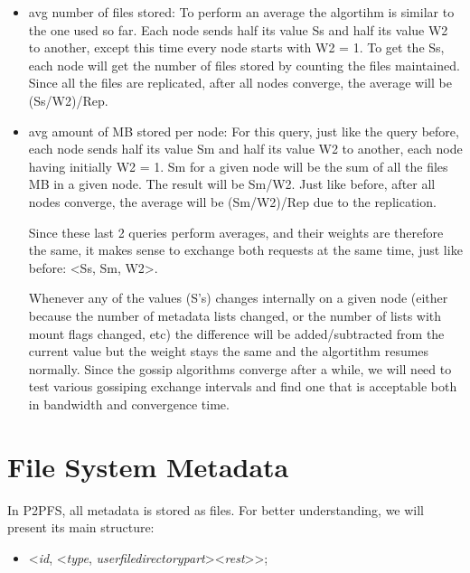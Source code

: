 \documentclass[times,9pt,article]{llncs}
\begin{document}
\begin{itemize}
\item avg number of files stored:
To perform an average the algortihm is similar to the one used so far. Each node
sends half its value Ss and half its value W2 to another, except this time every 
node starts with W2 = 1. To get the Ss, each node will get the number of files 
stored by counting the files maintained. Since all the files are replicated, after
all nodes converge, the average will be (Ss/W2)/Rep.

\item avg amount of MB stored per node:
For this query, just like the query before, each node sends half its value Sm and 
half its value W2 to another, each node having initially W2 = 1. Sm for a given node
will be the sum of all the files MB in a given node. The result will be Sm/W2. Just
like before, after all nodes converge, the average will be (Sm/W2)/Rep due to the 
replication.

Since these last 2 queries perform averages, and their weights are therefore the same,
it makes sense to exchange both requests at the same time, just like before:
\textless Ss, Sm, W2\textgreater.

Whenever any of the values (S's) changes internally on a given node (either because
the number of metadata lists changed, or the number of lists with mount flags changed,
etc) the difference will be added/subtracted from the current value but the weight 
stays the same and the algortithm resumes normally.
Since the gossip algorithms converge after a while, we will need to test various
gossiping exchange intervals and find one that is acceptable both in bandwidth and
convergence time.

\end{itemize} 

\section{File System Metadata}


In P2PFS, all metadata is stored as files. For better understanding, we will
present its main structure:
\begin{itemize}
\item \textless \emph{id}, \textless \emph{type}, \emph{user}\textbar \emph{file}\textbar \emph{directory}\textbar \emph{part}\textgreater \textless \emph{rest}\textgreater\textgreater ;
\end{itemize}
\end{document}
